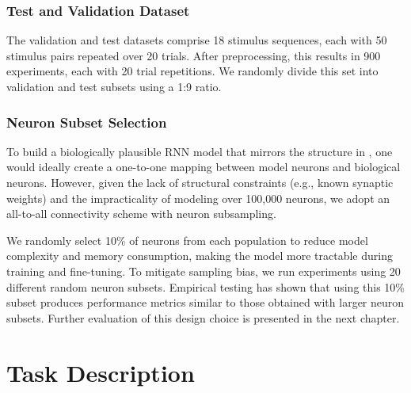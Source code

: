 \subsubsection{Test and Validation Dataset}
\label{subsubsec:test_dataset}

The validation and test datasets comprise 18 stimulus sequences, each with 50 stimulus pairs repeated over 20 trials. After preprocessing, this results in 900 experiments, each with 20 trial repetitions. We randomly divide this set into validation and test subsets using a 1:9 ratio.

\subsubsection{Neuron Subset Selection}
\label{subsubsec:subset_selection}

To build a biologically plausible RNN model that mirrors the structure in \citet{antolik2024comprehensive}, one would ideally create a one-to-one mapping between model neurons and biological neurons. However, given the lack of structural constraints (e.g., known synaptic weights) and the impracticality of modeling over 100,000 neurons, we adopt an all-to-all connectivity scheme with neuron subsampling.

We randomly select 10\% of neurons from each population to reduce model complexity and memory consumption, making the model more tractable during training and fine-tuning. To mitigate sampling bias, we run experiments using 20 different random neuron subsets. Empirical testing has shown that using this 10\% subset produces performance metrics similar to those obtained with larger neuron subsets. Further evaluation of this design choice is presented in the next chapter.

\section{Task Description}
\label{sec:task_description}